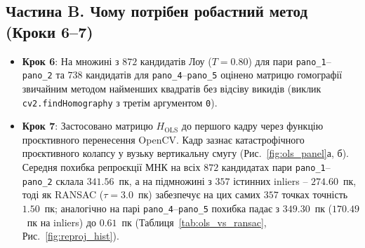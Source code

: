 \documentclass[14pt, a4paper]{extarticle}
\begin{document}
\subsection{Частина B. Чому потрібен робастний метод (Кроки 6--7)}
\begin{itemize}
    \item \textbf{Крок 6}: На множині з $872$ кандидатів Лоу ($T=0.80$) для пари \texttt{pano\_1}--\texttt{pano\_2} та $738$ кандидатів для \texttt{pano\_4}--\texttt{pano\_5} оцінено матрицю гомографії звичайним методом найменших квадратів без відсіву викидів (виклик \texttt{cv2.findHomography} з третім аргументом \texttt{0}).
    \item \textbf{Крок 7}: Застосовано матрицю $H_{\text{OLS}}$ до першого кадру через функцію проєктивного перенесення OpenCV. Кадр зазнає катастрофічного проєктивного колапсу у вузьку вертикальну смугу (Рис.~\ref{fig:ols_panel}а, б). Середня похибка репроєкції МНК на всіх $872$ кандидатах пари \texttt{pano\_1}--\texttt{pano\_2} склала $\mathbf{341.56}$~пк, а на підмножині з $357$ істинних inliers -- $\mathbf{274.60}$~пк, тоді як RANSAC ($\tau=3.0$~пк) забезпечує на цих самих $357$ точках точність $\mathbf{1.50}$~пк; аналогічно на парі \texttt{pano\_4}--\texttt{pano\_5} похибка падає з $\mathbf{349.30}$~пк ($170.49$~пк на inliers) до $\mathbf{0.61}$~пк (Таблиця~\ref{tab:ols_vs_ransac}, Рис.~\ref{fig:reproj_hist}).
\end{itemize}
\end{document}
